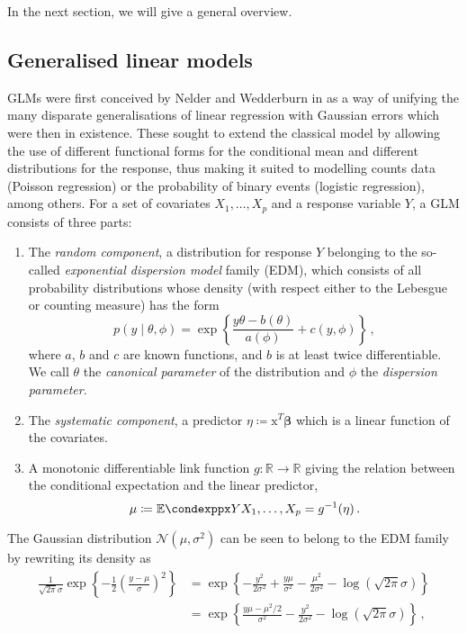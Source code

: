 \documentclass[a4paper]{book}
\begin{document}
In the next section, we will give a general overview.

\subsection{Generalised linear models} \label{subsec:glm}

GLMs were first conceived by Nelder and Wedderburn in \cite{nelder} as a way of unifying the many disparate generalisations of linear regression with Gaussian errors which were then in existence. These sought to extend the classical model by allowing the use of different functional forms for the conditional mean and different distributions for the response, thus making it suited to modelling counts data (Poisson regression) or the probability of binary events (logistic regression), among others. For a set of covariates $X_1, \dots, X_p$ and a response variable $Y$, a GLM consists of three parts:
\begin{enumerate}
  \item The \emph{random component}, a distribution for response $Y$ belonging to the so-called \emph{exponential dispersion model} family (EDM), which consists of all probability distributions whose density (with respect either to the Lebesgue or counting measure) has the form
  \begin{equation} \label{eq:exp-disp-fam}
    p(y \mid \theta, \phi) = \exp \left \{ \frac{y \theta - b(\theta)}{a(\phi)} + c(y, \phi) \right \} \,,
  \end{equation}
  where $a$, $b$ and $c$ are known functions, and $b$ is at least twice differentiable. We call $\theta$ the \emph{canonical parameter} of the distribution and $\phi$ the \emph{dispersion parameter}.
  \item The \emph{systematic component}, a predictor $\eta \coloneqq \bm{\mathrm{x}}^T \bm{\beta}$ which is a linear function of the covariates.
  \item A monotonic differentiable link function $g: \mathbb{R} \rightarrow \mathbb{R}$ giving the relation between the conditional expectation and the linear predictor,
  \begin{equation}
    \mu \coloneqq \condexpp{Y}{X_1, \dots, X_p} = g^{-1}(\eta) \,.
  \end{equation}
\end{enumerate}
The Gaussian distribution $\mathcal{N}(\mu, \sigma^2)$ can be seen to belong to the EDM family by rewriting its density as
\begin{align}
  \frac{1}{\sqrt{2 \pi} \sigma} \exp \left \{ -\frac{1}{2} \left( \frac{y - \mu}{\sigma} \right)^2\right \} &= \exp \left \{ -\frac{y^2}{2 \sigma^2} + \frac{y \mu}{\sigma^2} - \frac{\mu^2}{2 \sigma^2} - \log(\sqrt{2 \pi} \sigma) \right \} \\
  &= \exp \left \{ \frac{y \mu - \mu^2 / 2}{\sigma^2} - \frac{y^2}{2 \sigma^2} - \log(\sqrt{2 \pi} \sigma) \right \} \,,
\end{align}
\end{document}
